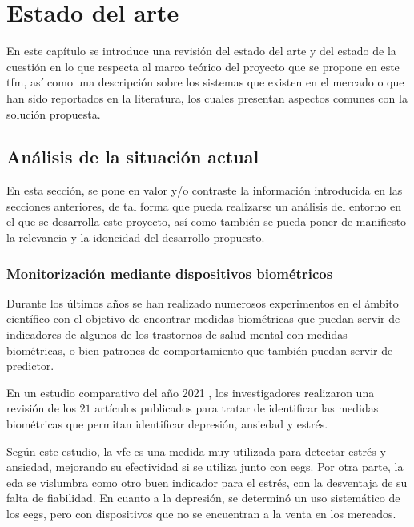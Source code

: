 \chapter{Estado del arte}
\label{chapter:estado_arte}


En este capítulo se introduce una revisión del estado del arte y del estado de la cuestión en lo que respecta al marco teórico del proyecto que se propone en este \gls{tfm}, así como una descripción sobre los sistemas que existen en el mercado o que han sido reportados en la literatura, los cuales presentan aspectos comunes con la solución propuesta.

\section{Análisis de la situación actual}

    En esta sección, se pone en valor y/o contraste la información introducida en las secciones anteriores, de tal forma que pueda realizarse un análisis del entorno en el que se desarrolla este proyecto, así como también se pueda poner de manifiesto la relevancia y la idoneidad del desarrollo propuesto. 
    
    \subsection{Monitorización mediante dispositivos biométricos}
        \label{sec:estado_arte:biometricos}

        Durante los últimos años se han realizado numerosos experimentos en el ámbito científico con el objetivo de encontrar medidas biométricas que puedan servir de indicadores de algunos de los trastornos de salud mental con medidas biométricas, o bien patrones de comportamiento que también puedan servir de predictor.

        En un estudio comparativo del año 2021 \cite{hickey_smart_2021}, los investigadores realizaron una revisión de los $21$ artículos publicados para tratar de identificar las medidas biométricas que permitan identificar depresión, ansiedad y estrés.

        Según este estudio, la \gls{vfc} es una medida muy utilizada para detectar estrés y ansiedad, mejorando su efectividad si se utiliza junto con \glspl{eeg}. Por otra parte, la \gls{eda} se vislumbra como otro buen indicador para el estrés, con la desventaja de su falta de fiabilidad. En cuanto a la depresión, se determinó un uso sistemático de los \glspl{eeg}, pero con dispositivos que no se encuentran a la venta en los mercados.

